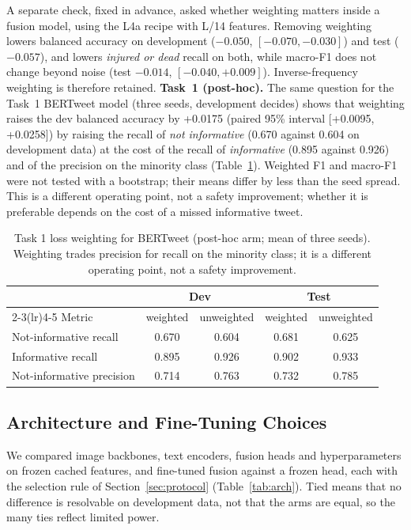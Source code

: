 \documentclass[conference]{IEEEtran}
\begin{document}
A separate check, fixed in advance, asked whether weighting matters inside a fusion model, using the L4a recipe with L/14 features. Removing weighting lowers balanced accuracy on development ($-0.050$, $[-0.070, -0.030]$) and test ($-0.057$), and lowers \emph{injured or dead} recall on both, while macro-F1 does not change beyond noise (test $-0.014$, $[-0.040, +0.009]$). Inverse-frequency weighting is therefore retained. \textbf{Task~1 (post-hoc).} The same question for the Task~1 BERTweet model (three seeds, development decides) shows that weighting raises the dev balanced accuracy by +0.0175 (paired 95\% interval [+0.0095, +0.0258]) by raising the recall of \emph{not informative} (0.670 against 0.604 on development data) at the cost of the recall of \emph{informative} (0.895 against 0.926) and of the precision on the minority class (Table~\ref{tab:weight1}). Weighted F1 and macro-F1 were not tested with a bootstrap; their means differ by less than the seed spread. This is a different operating point, not a safety improvement; whether it is preferable depends on the cost of a missed informative tweet.

\begin{table}[t]
\centering
\caption{Task 1 loss weighting for BERTweet (post-hoc arm; mean of three seeds). Weighting trades precision for recall on the minority class; it is a different operating point, not a safety improvement.}
\label{tab:weight1}
\footnotesize
\setlength{\tabcolsep}{3pt}
\begin{tabular}{lcccc}
\toprule
 & \multicolumn{2}{c}{Dev} & \multicolumn{2}{c}{Test} \\
\cmidrule(lr){2-3}\cmidrule(lr){4-5}
Metric & weighted & unweighted & weighted & unweighted \\
\midrule
Not-informative recall & 0.670 & 0.604 & 0.681 & 0.625 \\
Informative recall & 0.895 & 0.926 & 0.902 & 0.933 \\
Not-informative precision & 0.714 & 0.763 & 0.732 & 0.785 \\
\bottomrule
\end{tabular}
\end{table}


\subsection{Architecture and Fine-Tuning Choices}
\label{sec:arch}
We compared image backbones, text encoders, fusion heads and hyperparameters on frozen cached features, and fine-tuned fusion against a frozen head, each with the selection rule of Section~\ref{sec:protocol} (Table~\ref{tab:arch}). Tied means that no difference is resolvable on development data, not that the arms are equal, so the many ties reflect limited power.
\end{document}
